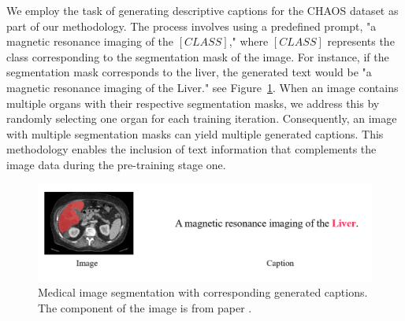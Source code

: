 We employ the task of generating descriptive captions for the CHAOS dataset as part of our methodology. The process involves using a predefined prompt, "a magnetic resonance imaging of the $[CLASS]$," where $[CLASS]$ represents the class corresponding to the segmentation mask of the image. For instance, if the segmentation mask corresponds to the liver, the generated text would be "a magnetic resonance imaging of the Liver."\; see Figure~\ref{fig:genCaption}. When an image contains multiple organs with their respective segmentation masks, we address this by randomly selecting one organ for each training iteration. Consequently, an image with multiple segmentation masks can yield multiple generated captions. This methodology enables the inclusion of text information that complements the image data during the pre-training stage one.

\begin{figure}[t]
\begin{center}
\includegraphics[width=1.0\linewidth]{Chapter_3/chap3_genCaption.png}
\end{center}
   \caption{Medical image segmentation with corresponding generated captions. The component of the image is from paper \cite{kavur2021chaos}.
}
\label{fig:genCaption}
\end{figure}